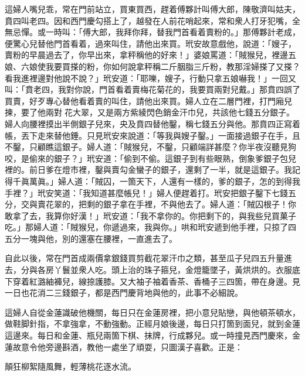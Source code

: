 這婦人嘴兒乖，常在門前站立，買東買西，趕着傅夥計叫傅大郎，陳敬濟叫姑夫，賁四叫老四。因和西門慶勾搭上了，越發在人前花哨起來，常和衆人打牙犯嘴，全無忌憚。或一時叫：「傅大郎，我拜你拜，替我門首看着賣粉的。」{}那傅夥計老成，便驚心兒替他門首看着，過來叫住，請他出來買。玳安故意戲他，說道：「嫂子，賣粉的早晨過去了，你早出來，拿秤稱他的好來！」婆娘罵道：「賊猴兒，裡邊五娘、六娘使我要買搽的粉，你如何說拿秤稱二斤胭脂三斤粉，教那淫婦搽了又搽？看我進裡邊對他說不說？」玳安道：「耶嚛，嫂子，行動只拿五娘嚇我！」一回又叫：「賁老四，我對你說，門首看着賣梅花菊花的，我要買兩對兒戴。」{}那賁四誤了買賣，好歹專心替他看着賣的叫住，請他出來買。婦人立在二層門裡，打門廂兒揀，要了他兩對𩬆花大翠，又是兩方紫綾閃色銷金汗巾兒，共該他七錢五分銀子。婦人向腰裡摸出半側銀子兒來，央及賁四替他鑿，稱七錢五分與他。那賁四正寫着帳，丟下走來替他錘。只見玳安來說道：「等我與嫂子鑿。」一面接過銀子在手，且不鑿，只顧瞧這銀子。{}婦人道：「賊猴兒，不鑿，只顧端詳甚麼？你半夜沒聽見狗咬，是偷來的銀子？」玳安道：「偷到不偷。這銀子到有些眼熟，倒象爹銀子包兒裡的。前日爹在燈市裡，鑿與賣勾金蠻子的銀子，還剩了一半，就是這銀子。我記得千眞萬眞。」婦人道：「賊囚，一箇天下，人還有一樣的，爹的銀子，怎的到得我手裡？」{}玳安笑道：「我知道甚麼帳兒！」婦人便趕着打。玳安把銀子鑿下七錢五分，交與賣花翠的，把剩的銀子拿在手裡，不與他去了。婦人道：「賊囚根子！你敢拿了去，我算你好漢！」玳安道：「我不拿你的。你把剩下的，與我些兒買菓子吃。」那婦人道：「賊猴兒，你遞過來，我與你。」哄和玳安遞到他手裡，只掠了四五分一塊與他，別的還塞在腰裡，一直進去了。

自此以後，常在門首成兩價拿銀錢買剪截花翠汗巾之類，甚至瓜子兒四五升量進去，分與各房丫鬟並衆人吃。頭上治的珠子箍兒，金燈籠墜子，黃烘烘的。衣服底下穿着紅潞紬褲兒，線捺護膝。又大袖子袖着香茶、香桶子三四箇，帶在身邊。見一日也花消二三錢銀子，都是西門慶背地與他的，此事不必細說。

這婦人自從金蓮識破他機關，每日只在金蓮房裡，把小意兒貼戀，與他頓茶頓水，做鞋脚針指，不拿強拿，不動強動。正經月娘後邊，每日只打箇到面兒，就到金蓮這邊來。每日和金蓮、瓶兒兩箇下棋、抹牌，行成夥兒。或一時撞見西門慶來，金蓮故意令他旁邊斟酒，教他一處坐了頑耍，只圖漢子喜歡。正是：

\begin{myquote} 
顛狂柳絮隨風舞，輕薄桃花逐水流。
\end{myquote} 

